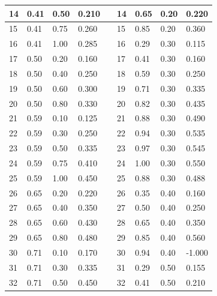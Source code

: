 \documentclass{article}
\begin{document}
\begin{doublespacing}
\begin{appendices}
\begin{longtable}[c]{|l|l|l|l|
>{\columncolor[HTML]{333333}}l |l|l|l|l|}
14             & 0.41    & 0.50  & 0.210  &  & 14           & 0.65    & 0.20  & 0.220  \\ \hline
15             & 0.41    & 0.75  & 0.260  &  & 15           & 0.85    & 0.20  & 0.360  \\ \hline
16             & 0.41    & 1.00  & 0.285  &  & 16           & 0.29    & 0.30  & 0.115  \\ \hline
17             & 0.50    & 0.20  & 0.160  &  & 17           & 0.41    & 0.30  & 0.160  \\ \hline
18             & 0.50    & 0.40  & 0.250  &  & 18           & 0.59    & 0.30  & 0.250  \\ \hline
19             & 0.50    & 0.60  & 0.300  &  & 19           & 0.71    & 0.30  & 0.335  \\ \hline
20             & 0.50    & 0.80  & 0.330  &  & 20           & 0.82    & 0.30  & 0.435  \\ \hline
21             & 0.59    & 0.10  & 0.125  &  & 21           & 0.88    & 0.30  & 0.490  \\ \hline
22             & 0.59    & 0.30  & 0.250  &  & 22           & 0.94    & 0.30  & 0.535  \\ \hline
23             & 0.59    & 0.50  & 0.335  &  & 23           & 0.97    & 0.30  & 0.545  \\ \hline
24             & 0.59    & 0.75  & 0.410  &  & 24           & 1.00    & 0.30  & 0.550  \\ \hline
25             & 0.59    & 1.00  & 0.450  &  & 25           & 0.88    & 0.30  & 0.488  \\ \hline
26             & 0.65    & 0.20  & 0.220  &  & 26           & 0.35    & 0.40  & 0.160  \\ \hline
27             & 0.65    & 0.40  & 0.350  &  & 27           & 0.50    & 0.40  & 0.250  \\ \hline
28             & 0.65    & 0.60  & 0.430  &  & 28           & 0.65    & 0.40  & 0.350  \\ \hline
29             & 0.65    & 0.80  & 0.480  &  & 29           & 0.85    & 0.40  & 0.560  \\ \hline
30             & 0.71    & 0.10  & 0.170  &  & 30           & 0.94    & 0.40  & -1.000 \\ \hline
31             & 0.71    & 0.30  & 0.335  &  & 31           & 0.29    & 0.50  & 0.155  \\ \hline
32             & 0.71    & 0.50  & 0.450  &  & 32           & 0.41    & 0.50  & 0.210  \\ \hline

\end{longtable}
\end{appendices}
\end{doublespacing}
\end{document}
